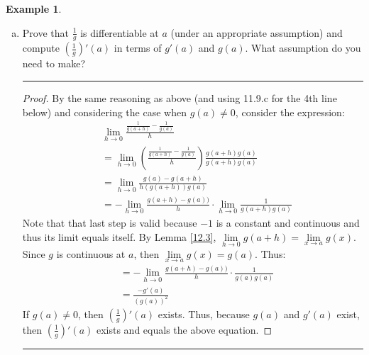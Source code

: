 \documentclass[openany, amssymb, psamsfonts]{amsart}
\theoremstyle{definition}
\newtheorem{exmp}{Example}[section]
\numberwithin{equation}{section}
\begin{document}
\begin{exmp}
\begin{enumerate}[(a)]
\begin{proof}
\begin{align*}
  \end{align*}
  By Lemma \ref{12.3}, $\lim\limits_{h\to 0}g(a+h) = \lim\limits_{x\to a}g(x)$. Since $g$ is continuous at $a$, then $\lim\limits_{x\to a}g(x) = g(a)$. Thus:
  \begin{align*}
  &=g(a)\lim\limits_{h\to 0}\frac{(f(a+h) -f(a))}{h} + f(a)\lim\limits_{h\to 0}\frac{(g(a+h) - g(a))}{h}\\
  &=g(a)f'(a)+f(a)g'(a)
  \end{align*}
  Thus, because $g(a), f'(a), f(a)$ and $g'(a)$ exist, then $(fg)'(a)$ exists and equals the above equation.
  \end{proof}\vspace{4pt}     \hrule   \vspace{4pt}
		\item Prove that $\frac{1}{g}$ is differentiable at $a$ (under an appropriate assumption) and compute $(\frac{1}{g})'(a)$ in terms of $g'(a)$ and $g(a)$. What assumption do you need to make? 
\vspace{4pt}     \hrule   \vspace{4pt}  \begin{proof}
By the same reasoning as above (and using 11.9.c for the 4th line below) and considering the case when $g(a) \neq 0$, consider the expression:
\begin{align*}
    &\lim\limits_{h\to 0} \frac{\frac{1}{g(a+h)} - \frac{1}{g(a)}}{h}\\
    &= \lim\limits_{h\to 0} (\frac{\frac{1}{g(a+h)} - \frac{1}{g(a)}}{h}) \frac{g(a+h)g(a)}{g(a+h)g(a)}\\
    &=\lim\limits_{h\to 0} \frac{g(a) - g(a+h)}{h(g(a+h))g(a)}\\
    &=-\lim\limits_{h\to 0} \frac{g(a+h) - g(a))}{h} \cdot \lim\limits_{h\to 0} \frac{1}{g(a+h)g(a)}
\end{align*}
  Note that that last step is valid because $-1$ is a constant and continuous and thus its limit equals itself. By Lemma \ref{12.3}, $\lim\limits_{h\to 0}g(a+h) = \lim\limits_{x\to a}g(x)$. Since $g$ is continuous at $a$, then $\lim\limits_{x\to a}g(x) = g(a)$. Thus:
  \begin{align*}
     &=  -\lim\limits_{h\to 0} \frac{g(a+h) - g(a))}{h} \cdot \frac{1}{g(a)g(a)}\\
      &= \frac{-g'(a)}{(g(a))^2}
  \end{align*}
   If $g(a)\neq 0$, then $(\frac{1}{g})'(a)$ exists. Thus, because $g(a)$ and $g'(a)$ exist, then $(\frac{1}{g})'(a)$ exists and equals the above equation.
\end{proof}\vspace{4pt}     \hrule   \vspace{4pt}

\end{enumerate}
\end{exmp}
\end{document}
